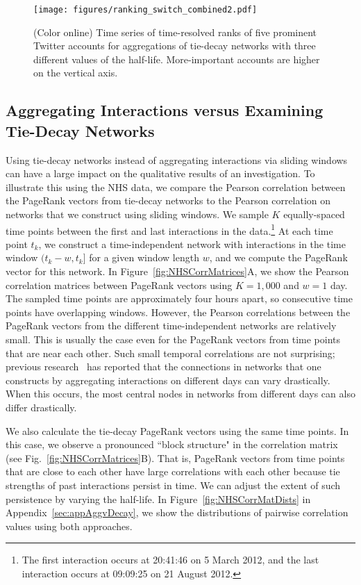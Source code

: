\documentclass[journal,transmag]{IEEEtran}
\begin{document}
\begin{figure}[tp]
  \centering
  \texttt{[image: figures/ranking\_switch\_combined2.pdf]}
  \caption{(Color online) Time series of 
  time-resolved ranks of five prominent Twitter accounts for aggregations of tie-decay networks
    with three different values of the half-life. More-important
    accounts are higher on the vertical axis.}
  \label{fig:ranking_switch}
\end{figure}


\subsection{Aggregating Interactions versus Examining Tie-Decay Networks}
\label{sec:aggvdecay}
%
Using tie-decay networks instead of aggregating interactions via
sliding windows can have a large impact on the qualitative
results of an investigation. To illustrate this using the NHS data,
we compare
{the Pearson correlation between the PageRank vectors}
from tie-decay networks to the Pearson correlation on networks that we construct using sliding windows.
 We sample $K$
equally-spaced time points between the first and last interactions in
the data.\footnote{{The first interaction occurs at
    20:41:46 on 5 March 2012, and the last interaction occurs at 09:09:25 on 21 August
    2012.}} At each time point $t_k$, we construct a time-independent
network with interactions in the time window $(t_k - w, t_k]$ for a
  given window length $w$, and we compute the PageRank vector for this network.
  In Figure~\ref{fig:NHSCorrMatrices}A, we show the Pearson correlation
  matrices between PageRank vectors using $K=1,000$ and $w = 1$
  day. The sampled time points are approximately four hours apart, so
  consecutive time points have overlapping windows. However,
  the Pearson correlations between the PageRank vectors from the different time-independent networks
  are relatively small. This is usually the case even for the PageRank vectors from time points that are near each other.
    Such small temporal correlations are not surprising;
  previous research~\cite{braha2006centrality} has reported that the
  connections in networks that one constructs by aggregating interactions on
  different days can vary drastically. When this occurs, the most
  central nodes in networks from different days can also differ
  drastically. 

We also calculate the tie-decay PageRank vectors using the same time
points. In this case, we observe a pronounced ``block structure" in
the correlation matrix (see Fig.~\ref{fig:NHSCorrMatrices}B). That is, PageRank
vectors from time points that are close to each other have large
correlations with each other because tie strengths of past
interactions persist in time. We can adjust the extent of such
persistence by varying the half-life. In Figure~\ref{fig:NHSCorrMatDists}
in Appendix~\ref{sec:appAggvDecay}, we show the distributions of
pairwise correlation values using both approaches.
\end{document}
